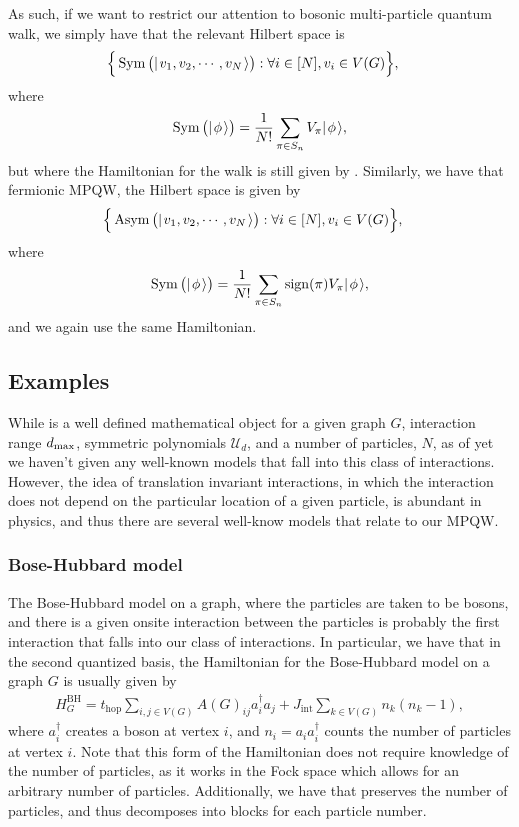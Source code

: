 \documentclass[../thesis-main/thesis-main]{subfiles}
\begin{document}
As such, if we want to restrict our attention to bosonic multi-particle quantum walk, we simply have that the relevant Hilbert space is
\begin{align}
  \span\Big\{\Sym\big(\ket{v_1,v_2,\cdots,v_N} \big): \forall i\in [N], v_i\in V(G) \Big\},
\end{align}
where
\begin{align}
  \operatorname{Sym}\big(|\mspace{2mu} \phi \mspace{2mu} \rangle\big) = \frac{1}{N!} \sum_{\pi\in S_n} V_\pi |\mspace{2mu} \phi \mspace{2mu} \rangle,
\end{align}
but where the Hamiltonian for the walk is still given by .  Similarly, we have that fermionic MPQW, the Hilbert space is given by 
\begin{align}
  \span\Big\{\ASym\big(\ket{v_1,v_2,\cdots,v_N} \big): \forall i\in [N], v_i\in V(G) \Big\},
\end{align}
where
\begin{align}
  \operatorname{Sym}\big(|\mspace{2mu} \phi \mspace{2mu} \rangle\big) = \frac{1}{N!} \sum_{\pi\in S_n} \operatorname{sign}(\pi) V_\pi |\mspace{2mu} \phi \mspace{2mu} \rangle,
\end{align}
and we again use the same Hamiltonian.

\subsection{Examples}

While  is a well defined mathematical object for a given graph $G$, interaction range $d_{\text{max}}$, symmetric polynomials $\mathcal{U}_d$, and a number of particles, $N$, as of yet we haven't given any well-known models that fall into this class of interactions.  However, the idea of translation invariant interactions, in which the interaction does not depend on the particular location of a given particle, is abundant in physics, and thus there are several well-know models that relate to our MPQW.

\subsubsection{Bose-Hubbard model}

The Bose-Hubbard model on a graph, where the particles are taken to be bosons, and there is a given onsite interaction between the particles is probably the first interaction that falls into our class of interactions.  In particular, we have that in the second quantized basis, the Hamiltonian for the Bose-Hubbard model on a graph $G$ is usually given by 
\begin{align}
  H_{G}^{\text{BH}} = t_{\text{hop}} \sum_{i,j\in V(G)} A(G)_{ij} a_i^\dag a_j + J_\text{int} \sum_{k\in V(G)} n_k (n_k - 1), \label{eq:BH_H_Fock}
\end{align}
where $a_i^\dag$ creates a boson at vertex $i$, and $n_i = a_ia_i^\dag$ counts the number of particles at vertex $i$.  Note that this form of the Hamiltonian does not require knowledge of the number of particles, as it works in the Fock space which allows for an arbitrary number of particles.  Additionally, we have that  preserves the number of particles, and thus decomposes into blocks for each particle number.
\end{document}
